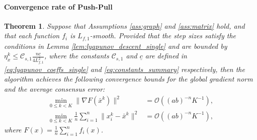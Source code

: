 \documentclass{article}
\theoremstyle{plain}
\newtheorem{theorem}{Theorem}[section]
\theoremstyle{definition}
\theoremstyle{remark}
\begin{document}
\paragraph{Convergence rate of Push-Pull}
\begin{theorem}
\label{thm:AB_convergenceZ_appZ_app}
    Suppose that Assumptions \ref{ass:graph} and \ref{ass:matrix} hold, and that each function $f_{i}$ is $L_{f,1}$-smooth. 
    Provided that the step sizes satisfy the conditions in Lemma \ref{lem:lyapunov_descent_single} and are bounded by $\eta_{x}^{k}\leq \mathcal{C}_{s,1} \frac{n\underline{c}}{4L_{f,1}^{2}}$, where the constants $\mathcal{C}_{s,1}$ and $\underline{c}$ are defined in \eqref{eq:lyapunov_coeffs_single} and \eqref{eq:constants_summary} respectively,
    then the algorithm achieves the following convergence bounds for the global gradient norm and the average consensus error:
    \begin{subequations}
    \begin{align}
        \min_{0 \le k < K} \|\nabla F(\bar{x}^k)\|^2 &= \mathcal{O}\left( (ab)^{-n} K^{-1} \right), \label{eq:grad_conv_app} \\
        \min_{0 \le k < K} \frac{1}{n}\sum_{i=1}^{n} \|x_{i}^{k} - \bar{x}^k\|^2 &= \mathcal{O}\left( (ab)^{-n} K^{-1} \right), \label{eq:cons_conv_app}
    \end{align}
    \end{subequations}
    where $F(x) =\frac{1}{n}\sum_{i=1}^{n}f_{i}(x)$.
\end{theorem}
\end{document}
